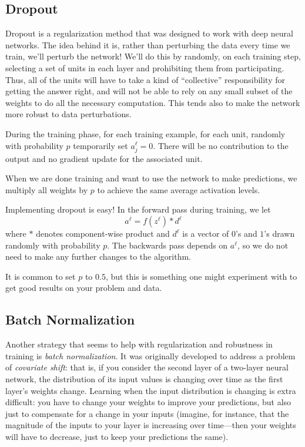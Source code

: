\subsection{Dropout}
Dropout is a regularization method that was designed to work with deep
neural networks.  The idea behind it is, rather than perturbing the
data every time we train, we'll perturb the network!  We'll do this by
randomly, on each training step, selecting a set of units in each
layer and prohibiting them from participating.   Thus, all of the
units will have to take a kind of  ``collective'' responsibility for
getting the answer right, and will not be able to rely on any small
subset of the weights to do all the necessary computation.  This tends
also to make the network more robust to data perturbations.

During the training phase, for each training example, for each unit,
randomly with probability $p$ temporarily set $a^{\ell}_j = 0$. There
will be no contribution to the output and no gradient update for the
associated unit.

When we are done training and want to use the network to make
predictions, we multiply all weights by $p$ to achieve the same average
activation levels. 

Implementing dropout is easy!  In the forward pass during training, we let
$$ a^{\ell} = f(z^{\ell}) * d^{\ell} $$
where $*$ denotes component-wise product and $d^{\ell}$ is a vector of
$0$'s and $1$'s drawn randomly with probability $p$.  
The backwards pass depends on $a^{\ell}$, so we do not need to make
any further changes to the algorithm.

It is common to set $p$ to $0.5$, but this is something one might
experiment with to get good results on your problem and data.


\subsection{Batch Normalization}

Another strategy that seems to help with regularization and robustness
in training is {\em batch normalization}.  
It was originally
developed to address a problem of {\em covariate shift}:  that is, if
you consider the second layer of a two-layer neural network, the
distribution of its input values is changing over time as the first
layer's  weights change.  Learning when the input distribution is
changing is extra difficult:  you have to change your weights to
improve your predictions, but also just to compensate for a change in
your inputs  (imagine, for instance, that the magnitude of the inputs
to your layer is increasing over time---then your weights will have to
decrease, just to keep your predictions the same).


